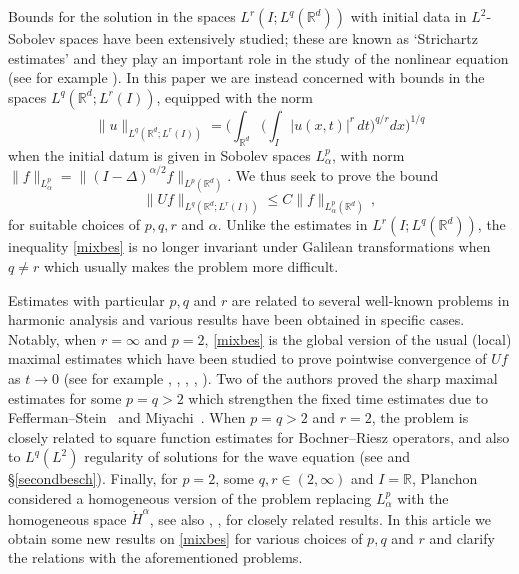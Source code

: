 \documentclass[11pt]{amsart}
\theoremstyle{definition}
\numberwithin{theorem}{section}
\numberwithin{definition}{section}
\numberwithin{equation}{section}
\renewcommand{\le}{\leqslant}
\def\bbR{{\mathbb {R}}}
\renewcommand{\le}{\leqslant}
\begin{document}
Bounds for the solution in  the spaces $L^r(I;L^q(\mathbb R^d))$
with initial data in $L^2$-Sobolev spaces  have been extensively
studied; these are known as  \lq Strichartz estimates' and they play
an  important role in the study of the  nonlinear  equation
 (see for example  \cite{tabook}).
In this paper we are  instead  concerned with bounds in the  spaces
$L^q(\bbR^d;L^r(I))$, equipped with the norm
$$ \|u\|_{L^q(\bbR^d;L^r(I))}= \Big(\int_{\bbR^d}\Big(\int_I |u(x,t)|^r
\, dt\Big)^{q/r}dx \Big)^{1/q}
$$
 when the initial datum is given in
Sobolev spaces $L^p_\alpha$,
with norm $\|f\|_{L^p_\alpha}=\|(I-\Delta)^{\alpha/2}f\|_{L^p(\bbR^d)}$. We thus
seek to prove the bound \begin{equation}\label{mixbes}
\|Uf\|_{L^{q}(\bbR^d;L^r(I))}\le C\|f\|_{L^p_{\alpha}(\bbR^d)}\,,
\end{equation}
for suitable choices of $p,q,r$ and $\alpha$. Unlike the estimates
in  $L^r(I;L^q(\mathbb R^d))$, the inequality \eqref{mixbes}  is no
longer invariant under Galilean transformations when $q\neq  r$
which usually  makes the problem   more difficult.

Estimates with particular $p,q$ and $r$ are
related to several well-known problems in harmonic analysis and various results have been  obtained in specific cases.  Notably, when $r=\infty$ and $p=2$,
   \eqref{mixbes} is the global version of the usual (local) maximal
estimates  which have been studied to prove
pointwise convergence of $Uf$
as $t\to 0$ (see for example \cite{camax}, \cite{ve}, \cite{boPrinc}, \cite{tava}, \cite{le1}). Two of the authors  \cite{rose}  proved  the sharp maximal estimates for some  $p=q>2$  which strengthen the fixed time estimates due to  Fefferman--Stein~\cite{fest}  and Miyachi~\cite{mi}.  When  $p=q> 2$ and $r=2$, the problem
 is closely related  to square function estimates for Bochner--Riesz
operators, and also to $L^q(L^2)$ regularity of solutions for the
wave equation   (see \cite{lerose} and \S \ref{secondbesch}).
Finally, for $p=2$,  some $q,r\in (2,\infty)$ and $I=\mathbb R$,
Planchon~\cite{planch} considered a homogeneous version of the
problem replacing $L^p_\alpha$ with the homogeneous space $\dot
H^\alpha$, see also  \cite{KPV}, \cite{RV}, \cite{tava} for closely
related results.   In this article we obtain some
new results on  \eqref{mixbes} for various choices of  $p, q$ and
$r$ and  clarify the relations with the aforementioned problems.
\end{document}
